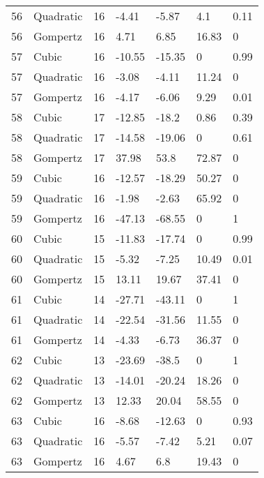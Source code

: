 \documentclass[11pt]{article}
\begin{document}
\begin{center}
\begin{longtable}{lllllll}
    56  & Quadratic & 16              & -4.41   & -5.87   & 4.1     & 0.11 \\
    56  & Gompertz  & 16              & 4.71    & 6.85    & 16.83   & 0    \\
    57  & Cubic     & 16              & -10.55  & -15.35  & 0       & 0.99 \\
    57  & Quadratic & 16              & -3.08   & -4.11   & 11.24   & 0    \\
    57  & Gompertz  & 16              & -4.17   & -6.06   & 9.29    & 0.01 \\
    58  & Cubic     & 17              & -12.85  & -18.2   & 0.86    & 0.39 \\
    58  & Quadratic & 17              & -14.58  & -19.06  & 0       & 0.61 \\
    58  & Gompertz  & 17              & 37.98   & 53.8    & 72.87   & 0    \\
    59  & Cubic     & 16              & -12.57  & -18.29  & 50.27   & 0    \\
    59  & Quadratic & 16              & -1.98   & -2.63   & 65.92   & 0    \\
    59  & Gompertz  & 16              & -47.13  & -68.55  & 0       & 1    \\
    60  & Cubic     & 15              & -11.83  & -17.74  & 0       & 0.99 \\
    60  & Quadratic & 15              & -5.32   & -7.25   & 10.49   & 0.01 \\
    60  & Gompertz  & 15              & 13.11   & 19.67   & 37.41   & 0    \\
    61  & Cubic     & 14              & -27.71  & -43.11  & 0       & 1    \\
    61  & Quadratic & 14              & -22.54  & -31.56  & 11.55   & 0    \\
    61  & Gompertz  & 14              & -4.33   & -6.73   & 36.37   & 0    \\
    62  & Cubic     & 13              & -23.69  & -38.5   & 0       & 1    \\
    62  & Quadratic & 13              & -14.01  & -20.24  & 18.26   & 0    \\
    62  & Gompertz  & 13              & 12.33   & 20.04   & 58.55   & 0    \\
    63  & Cubic     & 16              & -8.68   & -12.63  & 0       & 0.93 \\
    63  & Quadratic & 16              & -5.57   & -7.42   & 5.21    & 0.07 \\
    63  & Gompertz  & 16              & 4.67    & 6.8     & 19.43   & 0    \\

\end{longtable}
\end{center}
\end{document}
